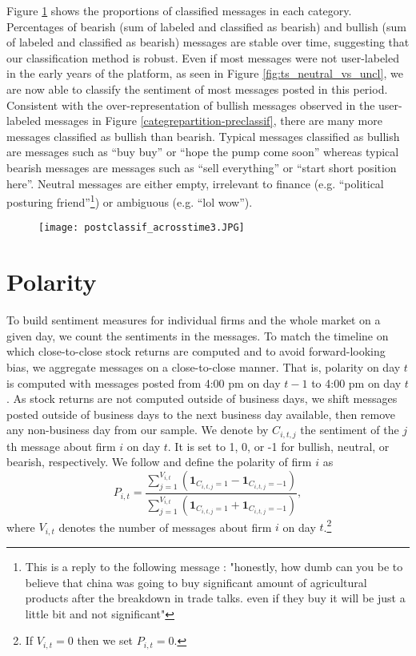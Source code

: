 Figure \ref{fig:postclassif_acrosstime} shows the proportions of classified messages in each category. Percentages of bearish (sum of labeled and classified as bearish) and bullish (sum of labeled and classified as bearish) messages are stable over time, suggesting that our classification method is robust. Even if most messages were not user-labeled in the early years of the platform, as seen in Figure \ref{fig:ts_neutral_vs_uncl}, we are now able to classify the sentiment of most messages posted in this period. Consistent with the over-representation of bullish messages observed in the user-labeled messages in Figure \ref{categrepartition-preclassif}, there are many more messages classified as bullish than bearish. Typical messages classified as bullish are messages such as “buy buy” or “hope the pump come soon” whereas typical bearish messages are messages such as “sell everything” or “start short position here”. Neutral messages are either empty, irrelevant to finance (e.g. “political posturing friend”\footnote{This is a reply to the following message : "honestly, how dumb can you be to believe that china was going to buy significant amount of agricultural products after the breakdown in trade talks. even if they buy it will be just a little bit and not significant"}) or ambiguous (e.g. “lol wow”).
 

\begin{figure}[h]
    \centering
    \texttt{[image: postclassif\_acrosstime3.JPG]}
    \label{fig:postclassif_acrosstime}
\end{figure}


\section{Polarity}\label{S:polarity}

To build sentiment measures for individual firms and the whole market on a given day, we count the sentiments in the messages. To match the timeline on which close-to-close stock returns are computed and to avoid forward-looking bias, we aggregate messages on a close-to-close manner. That is, polarity on day $t$ is computed with messages posted from 4:00 pm on day $t-1$ to 4:00 pm on day $t$. As stock returns are not computed outside of business days, we shift messages posted outside of business days to the next business day available, then remove any non-business day from our sample. We denote by $C_{i,t,j}$ the sentiment of the $j$th message about firm $i$ on day $t$. It is set to 1, 0, or -1 for bullish, neutral, or bearish, respectively. We follow \citet{ranco2015effects} and define the polarity of firm $i$ as
\[    P_{i,t} = \dfrac{\sum_{j=1}^{V_{i,t}} (\textbf{1}_{C_{i,t,j} = 1} - \textbf{1}_{C_{i,t,j} = -1})}{\sum_{j=1}^{V_{i,t}} (\textbf{1}_{C_{i,t,j} = 1} + \textbf{1}_{C_{i,t,j} = -1})},\]
where $V_{i,t}$ denotes the number of messages about firm $i$ on day $t$.\footnote{If $V_{i,t}=0$ then we set $P_{i,t} =0$.}

